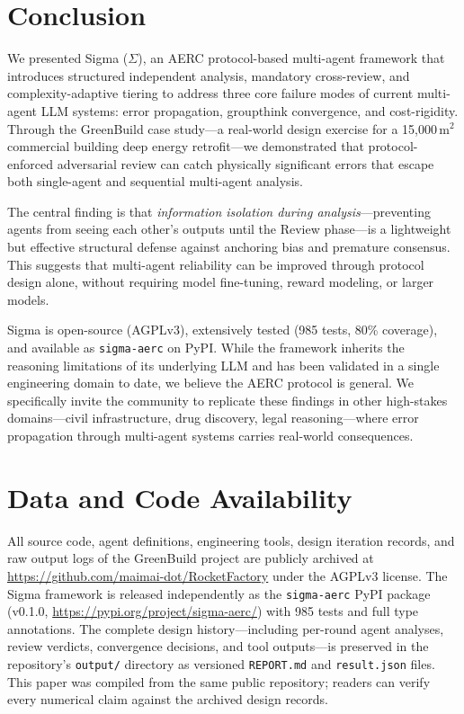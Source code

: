\documentclass[11pt,a4paper]{article}
\begin{document}
\section{Conclusion}

We presented Sigma ($\Sigma$), an AERC protocol-based multi-agent framework that introduces structured independent analysis, mandatory cross-review, and complexity-adaptive tiering to address three core failure modes of current multi-agent LLM systems: error propagation, groupthink convergence, and cost-rigidity. Through the GreenBuild case study---a real-world design exercise for a 15{,}000\,m$^2$ commercial building deep energy retrofit---we demonstrated that protocol-enforced adversarial review can catch physically significant errors that escape both single-agent and sequential multi-agent analysis.

The central finding is that \emph{information isolation during analysis}---preventing agents from seeing each other's outputs until the Review phase---is a lightweight but effective structural defense against anchoring bias and premature consensus. This suggests that multi-agent reliability can be improved through protocol design alone, without requiring model fine-tuning, reward modeling, or larger models.

Sigma is open-source (AGPLv3), extensively tested (985 tests, 80\% coverage), and available as \texttt{sigma-aerc} on PyPI. While the framework inherits the reasoning limitations of its underlying LLM and has been validated in a single engineering domain to date, we believe the AERC protocol is general. We specifically invite the community to replicate these findings in other high-stakes domains---civil infrastructure, drug discovery, legal reasoning---where error propagation through multi-agent systems carries real-world consequences.

\section*{Data and Code Availability}

All source code, agent definitions, engineering tools, design iteration records, and raw output logs of the GreenBuild project are publicly archived at \url{https://github.com/maimai-dot/RocketFactory} under the AGPLv3 license. The Sigma framework is released independently as the \texttt{sigma-aerc} PyPI package (v0.1.0, \url{https://pypi.org/project/sigma-aerc/}) with 985 tests and full type annotations. The complete design history---including per-round agent analyses, review verdicts, convergence decisions, and tool outputs---is preserved in the repository's \texttt{output/} directory as versioned \texttt{REPORT.md} and \texttt{result.json} files. This paper was compiled from the same public repository; readers can verify every numerical claim against the archived design records.
\end{document}
